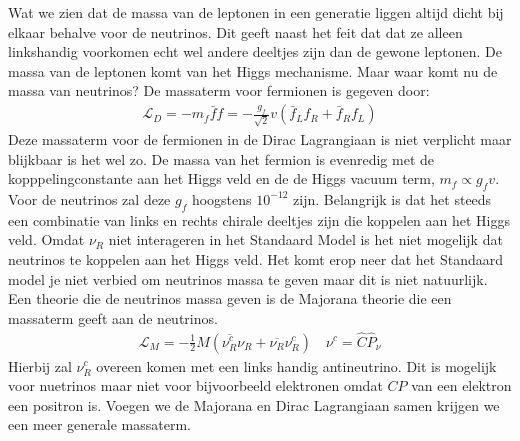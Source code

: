 \documentclass[../main.tex]{subfiles}
\begin{document}
Wat we zien dat de massa van de leptonen in een generatie liggen altijd dicht bij elkaar behalve voor de neutrinos. Dit geeft naast het feit dat dat ze alleen linkshandig voorkomen echt wel andere deeltjes zijn dan de gewone leptonen. De massa van de leptonen komt van het Higgs mechanisme. Maar waar komt nu de massa van neutrinos? De massaterm voor fermionen is gegeven door:
\begin{equation}
    \begin{aligned}
        \label{eq:massaterm_fermionen}
        \mathcal{L}_{D}=-m_{f} \bar{f} f=-\frac{g_{f}}{\sqrt{2}} v\left(\bar{f}_{L} f_{R}+\bar{f}_{R} f_{L}\right)
    \end{aligned}
\end{equation}
Deze massaterm voor de fermionen in de Dirac Lagrangiaan is niet verplicht maar blijkbaar is het wel zo. De massa van het fermion is evenredig met de kopppelingconstante aan het Higgs veld en de de Higgs vacuum term, $m_f\propto g_f v$. Voor de neutrinos zal deze $g_f$ hoogstens $10^{-12}$ zijn. Belangrijk is dat het steeds een combinatie van links en rechts chirale deeltjes zijn die koppelen aan het Higgs veld. Omdat $\nu_R$ niet interageren in het Standaard Model is het niet mogelijk dat neutrinos te koppelen aan het Higgs veld. Het komt erop neer dat het Standaard model je niet verbied om neutrinos massa te geven maar dit is niet natuurlijk. Een theorie die de neutrinos massa geven is de Majorana theorie die een massaterm geeft aan de neutrinos.
\begin{equation}
    \begin{aligned}
        \label{eq:majorana_massaterm}
        \mathcal{L}_{M}=-\frac{1}{2} M\left(\overline{\nu_{R}^{c}} \nu_{R}+\overline{\nu_{R}} \nu_{R}^{c}\right) \quad \nu^{c}=\hat{C} \hat{P}_{\nu}
    \end{aligned}
\end{equation}
Hierbij zal $\nu_R^c$ overeen komen met een links handig antineutrino. Dit is mogelijk voor nuetrinos maar niet voor bijvoorbeeld elektronen omdat $CP$ van een elektron een positron is. Voegen we de Majorana en Dirac Lagrangiaan samen krijgen we een meer generale massaterm.
\end{document}
